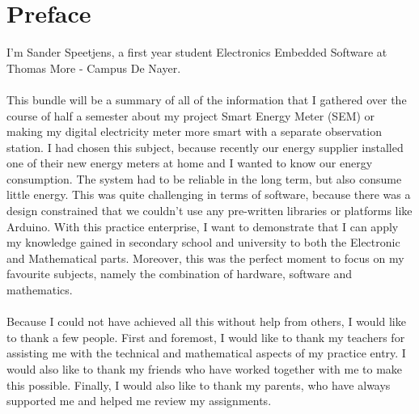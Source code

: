 \documentclass[a4paper,twoside, 12pt]{report}
\theoremstyle{break}
\begin{document}
\chapter*{Preface}
\thispagestyle{empty}
I'm Sander Speetjens, a first year student Electronics Embedded Software at Thomas More - Campus De Nayer.
\ \\ \ \\
This bundle will be a summary of all of the information that I gathered over the course of half a semester about my project Smart Energy Meter (SEM) or making my digital electricity meter more smart with a separate observation station. I had chosen this subject, because recently our energy supplier installed one of their new energy meters at home and I wanted to know our energy consumption. The system had to be reliable in the long term, but also consume little energy. This was quite challenging in terms of software, because there was a design constrained that we couldn't use any pre-written libraries or platforms like Arduino. With this practice enterprise, I want to demonstrate that I can apply my knowledge gained in secondary school and university to both the Electronic and Mathematical parts. Moreover, this was the perfect moment to focus on my favourite subjects, namely the combination of hardware, software and mathematics.
\ \\ \ \\
Because I could not have achieved all this without help from others, I would like to thank a few people. First and foremost, I would like to thank my teachers for assisting me with the technical and mathematical aspects of my practice entry.  I would also like to thank my friends who have worked together with me to make this possible.
Finally, I would also like to thank my parents, who have always supported me and helped me review my assignments.
\vfill
\eject


\clearpage{\pagestyle{empty}\cleardoublepage}


\setcounter{section}{0}
\setcounter{subsection}{0}

\tableofcontents
\thispagestyle{empty}

\vfill

\eject

\vfill
\end{document}

